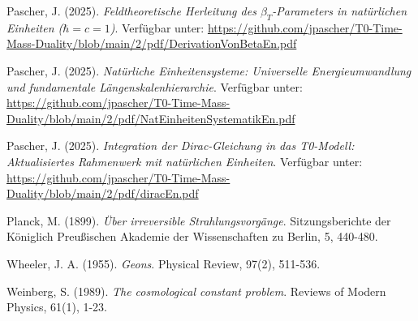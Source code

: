 \documentclass[12pt,a4paper]{article}
\begin{document}
	\begin{thebibliography}{9}
		Pascher, J. (2025). \textit{Feldtheoretische Herleitung des $\beta_T$-Parameters in natürlichen Einheiten ($\hbar = c = 1$)}. Verfügbar unter: \url{https://github.com/jpascher/T0-Time-Mass-Duality/blob/main/2/pdf/DerivationVonBetaEn.pdf}
		
		Pascher, J. (2025). \textit{Natürliche Einheitensysteme: Universelle Energieumwandlung und fundamentale Längenskalenhierarchie}. Verfügbar unter: \url{https://github.com/jpascher/T0-Time-Mass-Duality/blob/main/2/pdf/NatEinheitenSystematikEn.pdf}
		
		Pascher, J. (2025). \textit{Integration der Dirac-Gleichung in das T0-Modell: Aktualisiertes Rahmenwerk mit natürlichen Einheiten}. Verfügbar unter: \url{https://github.com/jpascher/T0-Time-Mass-Duality/blob/main/2/pdf/diracEn.pdf}
		
		Planck, M. (1899). \textit{Über irreversible Strahlungsvorgänge}. Sitzungsberichte der Königlich Preußischen Akademie der Wissenschaften zu Berlin, 5, 440-480.
		
		Wheeler, J. A. (1955). \textit{Geons}. Physical Review, 97(2), 511-536.
		
		Weinberg, S. (1989). \textit{The cosmological constant problem}. Reviews of Modern Physics, 61(1), 1-23.
	\end{thebibliography}
	
	
\end{document}
